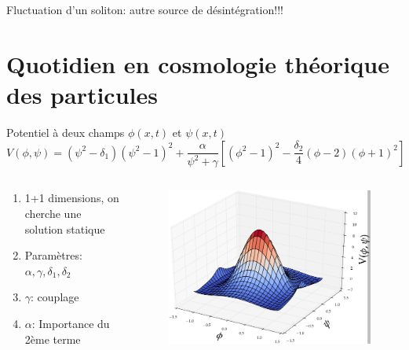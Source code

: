 \documentclass[handout]{beamer}
\begin{document}
\begin{frame}
Fluctuation d'un soliton: autre source de désintégration!!!\\
\end{frame}




\section{Quotidien en cosmologie théorique des particules}
\begin{frame}
\begin{block}{Potentiel à deux champs $\phi(x,t)$ et $\psi(x,t)$}
\begin{equation*}
V(\phi,\psi)=(\psi^2-\delta_1)(\psi^2-1)^2+\frac{\alpha}{\psi^2+\gamma}[(\phi^2-1)^2 - \frac{\delta_2}{4}(\phi-2)(\phi+1)^2] 
\end{equation*}

\end{block}
\begin{columns}[T]
    \begin{column}[T]{.5\linewidth}
  
\begin{enumerate}
\item 1+1 dimensions, on cherche une solution statique
\item Paramètres: $\alpha, \gamma, \delta_1, \delta_2$
\item $\gamma$: couplage
\item $\alpha$: Importance du 2ème terme 
\end{enumerate}  
    \end{column}
    \begin{column}[T]{.5\linewidth}
    \begin{figure}[0.3\textwidth]
    \includegraphics[scale=0.2]{potypot.png}
    \end{figure}
    \end{column}
  \end{columns}
\end{frame}
\end{document}
